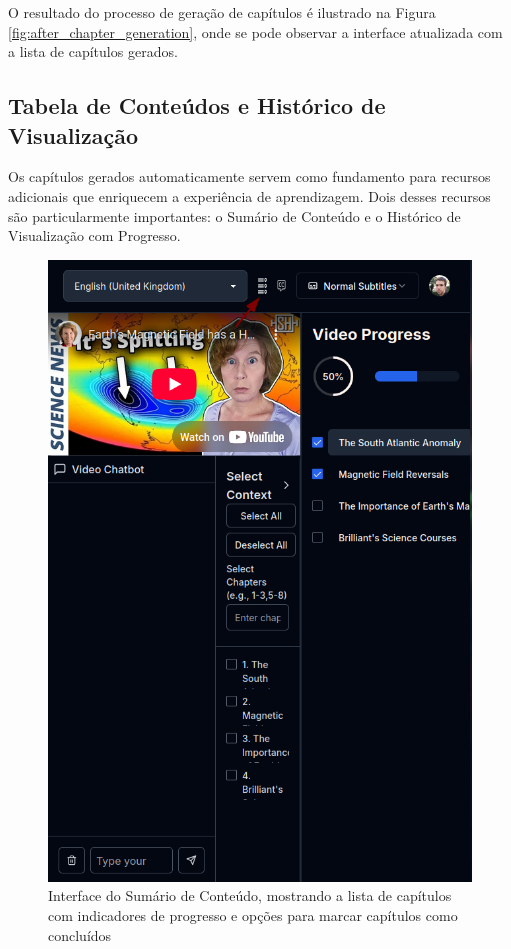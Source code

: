 \documentclass[tcc,capa]{texufpel}
\begin{document}
O resultado do processo de geração de capítulos é ilustrado na Figura \ref{fig:after_chapter_generation}, onde se pode observar a interface atualizada com a lista de capítulos gerados. 



\subsection{Tabela de Conteúdos e Histórico de Visualização}

Os capítulos gerados automaticamente servem como fundamento para recursos adicionais que enriquecem a experiência de aprendizagem. Dois desses recursos são particularmente importantes: o Sumário de Conteúdo e o Histórico de Visualização com Progresso.

\begin{figure}[H]
  \centering
  \includegraphics[width=\textwidth,height=0.45\textheight,keepaspectratio]{exemplo-slides/graphics/images/table of contents.png}
  \caption{Interface do Sumário de Conteúdo, mostrando a lista de capítulos com indicadores de progresso e opções para marcar capítulos como concluídos}
  \label{fig:table_of_contents}
\end{figure}
\end{document}
